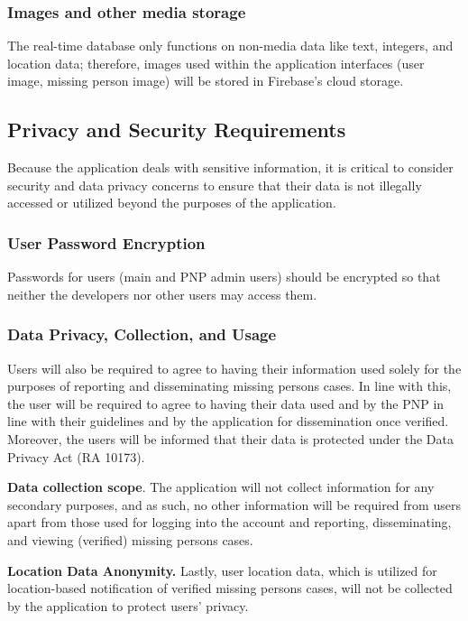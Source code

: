 \subsubsection{Images and other media storage}
The real-time database only functions on non-media data like text, integers, and location data; therefore, images used within the application interfaces (user image, missing person image) will be stored in Firebase’s cloud storage. 

\subsection{Privacy and Security Requirements}

Because the application deals with sensitive information, it is critical to consider security and data privacy concerns to ensure that their data is not illegally accessed or utilized beyond the purposes of the application.

\subsubsection{User Password Encryption}

Passwords for users (main and PNP admin users) should be encrypted so that neither the developers nor other users may access them. 

\subsubsection{Data Privacy, Collection, and Usage}

Users will also be required to agree to having their information used solely for the purposes of reporting and disseminating missing persons cases. In line with this, the user will be required to agree to having their data used and by the PNP in line with their guidelines and by the application for dissemination  once verified. Moreover, the users will be informed that their data is protected under the Data Privacy Act (RA 10173).

\textbf{Data collection scope}. The application will not collect information for any secondary purposes, and as such, no other information will be required from users apart from those used for logging into the account and reporting, disseminating, and viewing (verified) missing persons cases.

\textbf{Location Data Anonymity.} Lastly, user location data, which is utilized for location-based notification of verified missing persons cases, will not be collected by the application to protect users’ privacy.


